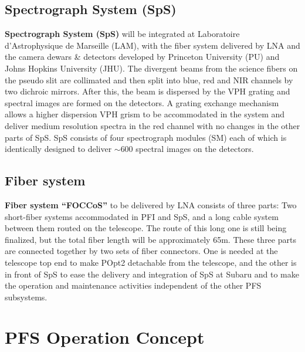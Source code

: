 \documentclass[a4paper]{article}
\begin{document}
\subsection{Spectrograph System (SpS)\label{sec:pfs_system:sps}}
{\bf Spectrograph System (SpS)} will be integrated at Laboratoire
d'Astrophysique de Marseille (LAM)\cite{madec16}, with the fiber
system delivered by LNA and the camera dewars \& detectors developed
by Princeton University (PU)\cite{gunn16} and Johns Hopkins University
(JHU)\cite{smee16, hart16}. The divergent beams from the science
fibers on the pseudo slit are collimated and then split into blue, red
and NIR channels by two dichroic mirrors. After this, the beam is
dispersed by the VPH grating and spectral images are formed on the
detectors. A grating exchange mechanism allows a higher dispersion VPH
grism to be accommodated in the system and deliver medium resolution
spectra in the red channel with no changes in the other parts of
SpS. SpS consists of four spectrograph modules (SM) each of which is
identically designed to deliver $\sim$600 spectral images on the
detectors.

\subsection{Fiber system\label{sec:pfs_system:fib}}
{\bf Fiber system ``FOCCoS''} to be delivered by LNA\cite{cesar14}
consists of three parts: Two short-fiber systems accommodated in PFI
and SpS, and a long cable system between them routed on the
telescope. The route of this long one is still being finalized, but
the total fiber length will be approximately 65m. These three parts
are connected together by two sets of fiber connectors. One is needed
at the telescope top end to make POpt2 detachable from the telescope,
and the other is in front of SpS to ease the delivery and integration
of SpS at Subaru and to make the operation and maintenance activities
independent of the other PFS subsystems.

\section{PFS Operation Concept}\label{sec:operation}
\end{document}
